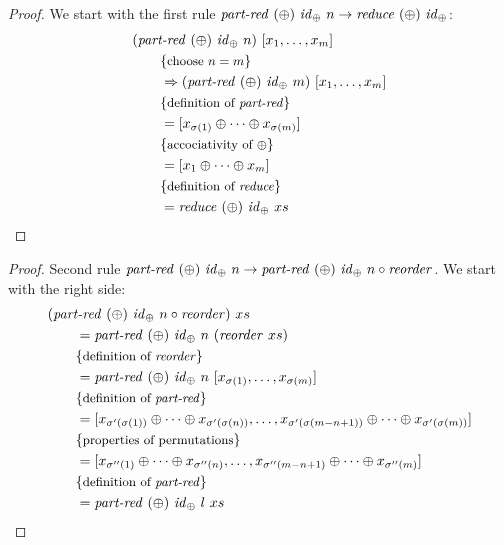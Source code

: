 \begin{proof}
  We start with the first rule $\text{\textit{part-red}}\ (\oplus)\ \text{\textit{id}}_\oplus\ n \rightarrow \text{\textit{reduce}}\ (\oplus)\ \text{\textit{id}}_\oplus$:
  \begin{align*}
    &(\text{\textit{part-red}}\ (\oplus)\ \text{\textit{id}}_\oplus\ n)\ [x_1, \ldots, x_m]\\
    &\qquad \{\text{\small choose $n=m$}\}\\
    &\qquad \Rightarrow (\text{\textit{part-red}}\ (\oplus)\ \text{\textit{id}}_\oplus\ m)\ [x_1, \ldots, x_m]\\
    &\qquad \{\text{\small definition of \text{\textit{part-red}}}\}\\
    &\qquad = [x_{\sigma(1)} \oplus \dots \oplus x_{\sigma(m)}]\\
    &\qquad \{\text{\small accociativity of $\oplus$}\}\\
    &\qquad = [x_1 \oplus \dots \oplus x_m]\\
    &\qquad \{\text{\small definition of \text{\textit{reduce}}}\}\\
    &\qquad = \text{\textit{reduce}}\ (\oplus)\ \text{\textit{id}}_\oplus\ xs
  \end{align*}
\end{proof}
\begin{proof}
  Second rule $\partRed\ (\oplus)\ \id_\oplus\ n \rightarrow \partRed\ (\oplus)\ \id_\oplus\ n \circ \reorder$.
  We start with the right side:
  \begin{align*}
    &(\text{\textit{part-red}}\ (\oplus)\ \text{\textit{id}}_\oplus\ n \circ \text{\textit{reorder}})\ xs\\
    &\qquad = \text{\textit{part-red}}\ (\oplus)\ \text{\textit{id}}_\oplus\ n\ (\text{\textit{reorder}}\ xs)\\
    &\qquad \{\text{\small definition of \text{\textit{reorder}}}\}\\
    &\qquad = \text{\textit{part-red}}\ (\oplus)\ \text{\textit{id}}_\oplus\ n\ [x_{\sigma(1)}, \ldots, x_{\sigma(m)}]\\
    &\qquad \{\text{\small definition of \text{\textit{part-red}}}\}\\
    &\qquad =[x_{\sigma'(\sigma(1))} \oplus \dots \oplus x_{\sigma'(\sigma(n))}, \ldots, x_{\sigma'(\sigma(m-n+1))} \oplus \dots \oplus x_{\sigma'(\sigma(m))}]\\
    &\qquad \{\text{\small properties of permutations}\}\\
    &\qquad =[x_{\sigma''(1)} \oplus \dots \oplus x_{\sigma''(n)}, \ldots, x_{\sigma''(m-n+1)} \oplus \dots \oplus x_{\sigma''(m)}]\\
    &\qquad \{\text{\small definition of \text{\textit{part-red}}}\}\\
    &\qquad = \text{\textit{part-red}}\ (\oplus)\ \text{\textit{id}}_\oplus\ l\ xs\\
  \end{align*}
\end{proof}
